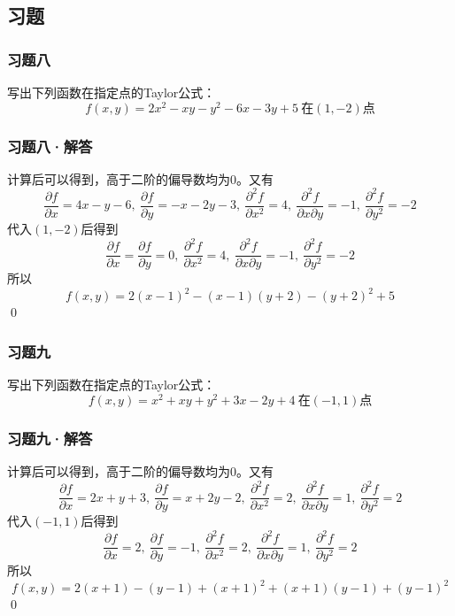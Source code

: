 \subsection{习题}
\begin{frame}
    \frametitle{习题八}

    写出下列函数在指定点的Taylor公式：
    $$f(x,y)=2x^2-xy-y^2-6x-3y+5\ \text{在}(1,-2)\text{点}$$

\end{frame}

\begin{frame}
    \frametitle{习题八·解答}

    计算后可以得到，高于二阶的偏导数均为0。\pause 又有$$\frac{\partial f}{\partial x}=4x-y-6,\ \frac{\partial f}{\partial y}=-x-2y-3,\ \frac{\partial^2 f}{\partial x^2}=4,\ \frac{\partial^2 f}{\partial x\partial y}=-1,\ \frac{\partial^2 f}{\partial y^2}=-2$$\pause
    代入$(1,-2)$后得到
    $$\frac{\partial f}{\partial x}=\frac{\partial f}{\partial y}=0,\ \frac{\partial^2 f}{\partial x^2}=4,\ \frac{\partial^2 f}{\partial x\partial y}=-1,\ \frac{\partial^2 f}{\partial y^2}=-2$$\pause
    所以
    $$f(x,y)=2(x-1)^2-(x-1)(y+2)-(y+2)^2+5$$
    \qed

\end{frame}

\begin{frame}
    \frametitle{习题九}

    写出下列函数在指定点的Taylor公式：
    $$f(x,y)=x^2+xy+y^2+3x-2y+4\ \text{在}(-1,1)\text{点}$$

\end{frame}

\begin{frame}
    \frametitle{习题九·解答}

    计算后可以得到，高于二阶的偏导数均为0。\pause 又有$$\frac{\partial f}{\partial x}=2x+y+3,\ \frac{\partial f}{\partial y}=x+2y-2,\ \frac{\partial^2 f}{\partial x^2}=2,\ \frac{\partial^2 f}{\partial x\partial y}=1,\ \frac{\partial^2 f}{\partial y^2}=2$$\pause
    代入$(-1,1)$后得到
    $$\frac{\partial f}{\partial x}=2,\ \frac{\partial f}{\partial y}=-1,\ \frac{\partial^2 f}{\partial x^2}=2,\ \frac{\partial^2 f}{\partial x\partial y}=1,\ \frac{\partial^2 f}{\partial y^2}=2$$\pause
    所以
    $$f(x,y)=2(x+1)-(y-1)+(x+1)^2+(x+1)(y-1)+(y-1)^2$$
    \qed

\end{frame}